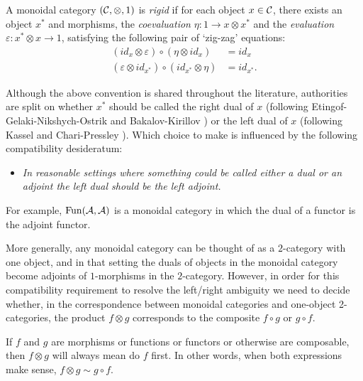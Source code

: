 \documentclass{amsart}
\begin{document}
\begin{definition} \label{def:rigid}
	A monoidal category $(\mathcal C, \otimes, 1)$ is {\em rigid} if for each object $x \in \mathcal C$, there exists an object $x^*$ and morphisms, the {\em coevaluation} $\eta: 1 \to x \otimes x^*$ and the {\em evaluation} $\varepsilon: x^* \otimes x \to 1$, satisfying the following pair of `zig-zag' equations:
	\begin{align*}
		(id_{x} \otimes \varepsilon  ) \circ (  \eta \otimes id_{x}) &= id_{x} \\
		(\varepsilon \otimes id_{x^*}) \circ (id_{x^*} \otimes \eta) &= id_{x^*}.
	\end{align*}
\end{definition}

Although the above convention is shared throughout the literature, authorities are split on whether $x^*$ should be called the right dual of $x$ (following Etingof-Gelaki-Nikshych-Ostrik \cite{EGNO} and Bakalov-Kirillov \cite{MR1797619})  or the left dual of $x$ (following Kassel \cite{MR1470954} and Chari-Pressley \cite{MR1358358}).  Which choice to make is influenced by the following compatibility desideratum: 
\begin{itemize}
\item[]
	\emph{In reasonable settings where something could be called either a dual or an adjoint the left dual should be the left adjoint.}
\end{itemize}

\nid For example, $\operatorname{Fun}(\mathcal A, \mathcal A)$ is a monoidal category in which the dual of a functor is the adjoint functor.  

More generally, any monoidal category can be thought of as a $2$-category with one object, and in that setting the duals of objects in the monoidal category become adjoints of $1$-morphisms in the $2$-category.  However, in order for this compatibility requirement to resolve the left/right ambiguity we need to decide whether, in the correspondence between monoidal categories and one-object 2-categories, the product $f \otimes g$ corresponds to the composite $f \circ g$ or $g \circ f$.

\begin{definition} \label{def-tensorcomp}
If $f$ and $g$ are morphisms or functions or functors or otherwise are composable, then $f \otimes g$ will always mean do $f$ first. In other words, when both expressions make sense, $f \otimes g \sim g \circ f$.
\end{definition}
\end{document}

